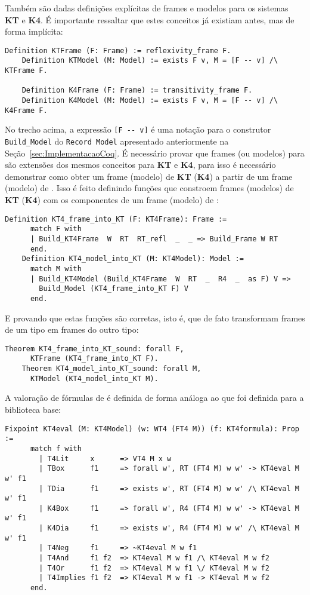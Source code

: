       Também são dadas definições explícitas de frames e modelos para os sistemas \textbf{KT} e \textbf{K4}. É importante ressaltar que estes conceitos já
      existiam antes, mas de forma implícita:
      \begin{lstlisting}[language=coq]
    Definition KTFrame (F: Frame) := reflexivity_frame F.
    Definition KTModel (M: Model) := exists F v, M = [F -- v] /\ KTFrame F.

    Definition K4Frame (F: Frame) := transitivity_frame F.
    Definition K4Model (M: Model) := exists F v, M = [F -- v] /\ K4Frame F.
      \end{lstlisting}

      No trecho acima, a expressão \verb+[F -- v]+ é uma notação para o construtor \texttt{Build\_Model} do \texttt{Record Model} apresentado
      anteriormente na Seção~\ref{sec:ImplementacaoCoq}. É necessário provar que frames (ou modelos) para \SisT são extensões dos mesmos conceitos
      para \textbf{KT} e \textbf{K4}, para isso é necessário demonstrar como obter um frame (modelo) de \textbf{KT} (\textbf{K4})
      a partir de um frame (modelo) de \SisT. Isso é feito definindo funções que constroem frames (modelos) de \textbf{KT} (\textbf{K4}) com os
      componentes de um frame (modelo) de \SisT:

      \begin{lstlisting}[language=coq]
    Definition KT4_frame_into_KT (F: KT4Frame): Frame :=
      match F with
      | Build_KT4Frame  W  RT  RT_refl  _  _ => Build_Frame W RT
      end.
    Definition KT4_model_into_KT (M: KT4Model): Model :=
      match M with
      | Build_KT4Model (Build_KT4Frame  W  RT  _  R4  _  as F) V =>
        Build_Model (KT4_frame_into_KT F) V
      end.
      \end{lstlisting}
      E provando que estas funções são corretas, isto é, que de fato transformam frames de um tipo em frames do outro tipo:

      \begin{lstlisting}[language=coq]
    Theorem KT4_frame_into_KT_sound: forall F,
      KTFrame (KT4_frame_into_KT F).
    Theorem KT4_model_into_KT_sound: forall M,
      KTModel (KT4_model_into_KT M).
      \end{lstlisting}

      A valoração de fórmulas de \SisT é definida de forma análoga ao que foi definida para a biblioteca base:

      \begin{lstlisting}[language=coq]
    Fixpoint KT4eval (M: KT4Model) (w: WT4 (FT4 M)) (f: KT4formula): Prop :=
      match f with
        | T4Lit     x      => VT4 M x w
        | TBox      f1     => forall w', RT (FT4 M) w w' -> KT4eval M w' f1
        | TDia      f1     => exists w', RT (FT4 M) w w' /\ KT4eval M w' f1
        | K4Box     f1     => forall w', R4 (FT4 M) w w' -> KT4eval M w' f1
        | K4Dia     f1     => exists w', R4 (FT4 M) w w' /\ KT4eval M w' f1
        | T4Neg     f1     => ~KT4eval M w f1
        | T4And     f1 f2  => KT4eval M w f1 /\ KT4eval M w f2
        | T4Or      f1 f2  => KT4eval M w f1 \/ KT4eval M w f2
        | T4Implies f1 f2  => KT4eval M w f1 -> KT4eval M w f2
      end.
      \end{lstlisting}

